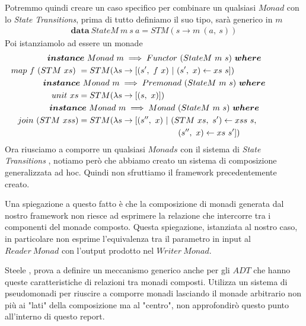 Potremmo quindi creare un caso specifico per combinare un qualsiasi $Monad$ con
lo \textit{State Transitions}, prima di tutto definiamo il suo tipo, sarà generico
in $m$
\begin{align*}
  \bm{data}\ StateM\ m\ s\ a = STM(s \to m\ (a,\ s))
\end{align*}
Poi istanziamolo ad essere un monade
\begin{align*}
  \classdef{\bm{instance}\ Monad\ m \implies Functor\ (StateM\ m\ s)\ \bm{where}}
  map\ f\ (STM\ xs)\ &= STM(\lambda s \to [(s',\ f\ x)\ |\ (s',\ x) \leftarrow xs\ s])\\
  \classdef{\bm{instance}\ Monad\ m \implies Premonad\ (StateM\ m\ s)\ \bm{where}}
  unit\ xs &= STM(\lambda s \to [(s,\ x)])\\
  \classdef{\bm{instance}\ Monad\ m \implies Monad\ (StateM\ m\ s)\ \bm{where}}
  join\ (STM\ xss) &= STM(\lambda s \to [(s'',\ x)\ |\ (STM\ xs,\ s') \leftarrow xss\ s, \\
                   &\qquad\qquad\qquad\qquad\qquad\qquad(s'',\ x) \leftarrow xs\ s'])\\
\end{align*}
Ora riusciamo a comporre un qualsiasi $Monads$ con il sistema di \textit{State Transitions}
, notiamo però che abbiamo creato un sistema di composizione generalizzata ad hoc.
Quindi non sfruttiamo il framework precedentemente creato.\newline

Una spiegazione a questo fatto è che la composizione di monadi generata dal
nostro framework non riesce ad esprimere la relazione che intercorre tra i
componenti del monade composto.
Questa spiegazione, istanziata al nostro caso, in particolare non esprime
l'equivalenza tra il parametro in input al $Reader\ Monad$ con l'output prodotto
nel $Writer\ Monad$.\newline

Steele \cite{steele0}, prova a definire un meccanismo generico anche per gli $ADT$
che hanno queste caratteristiche di relazioni tra monadi composti.
Utilizza un sistema di pseudomonadi per riuscire a comporre monadi lasciando il monade
arbitrario non più ai "lati" della composizione ma al "centro", non approfondirò
questo punto all'interno di questo report.